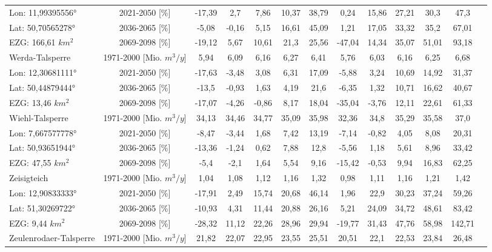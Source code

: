 \begin{longtable}{@{\extracolsep{\fill}}lc|ccccc||cccccc}
\cline{2-13} 
Lon: 11,99395556° & 2021-2050 [\%]  & -17,39 & 2,7 & 7,86 & 10,37 & 38,79 & 0,24 & 15,86 & 27,21 & 30,3 & 47,3 & \\ 
Lat: 50,70565278° & 2036-2065 [\%]  & -5,08 & -0,16 & 5,15 & 16,61 & 45,09 & 1,21 & 17,05 & 33,32 & 35,2 & 67,01 & \\ 
EZG: 166,61 $km^2$ & 2069-2098 [\%]  & -19,12 & 5,67 & 10,61 & 21,3 & 25,56 & -47,04 & 14,34 & 35,07 & 51,01 & 93,18 & \\ 
\hline 
Werda-Talsperre & 1971-2000 [Mio. $m^3/y$]  & 5,94 & 6,09 & 6,16 & 6,27 & 6,41 & 5,76 & 6,03 & 6,16 & 6,25 & 6,68 & \\ 
\cline{2-13} 
Lon: 12,30681111° & 2021-2050 [\%]  & -17,63 & -3,48 & 3,08 & 6,31 & 17,09 & -5,88 & 3,24 & 10,69 & 14,92 & 31,37 & \\ 
Lat: 50,44879444° & 2036-2065 [\%]  & -13,5 & -0,93 & 1,63 & 4,19 & 21,6 & -6,35 & 1,32 & 10,71 & 16,62 & 40,67 & \\ 
EZG: 13,46 $km^2$ & 2069-2098 [\%]  & -17,07 & -4,26 & -0,86 & 8,17 & 18,04 & -35,04 & -3,76 & 12,11 & 22,61 & 61,33 & \\ 
\hline 
Wiehl-Talsperre & 1971-2000 [Mio. $m^3/y$]  & 34,13 & 34,46 & 34,77 & 35,09 & 35,98 & 32,36 & 34,8 & 35,29 & 35,58 & 37,0 & \\ 
\cline{2-13} 
Lon: 7,667577778° & 2021-2050 [\%]  & -8,47 & -3,44 & 1,68 & 7,42 & 13,19 & -7,14 & -0,82 & 4,05 & 8,08 & 20,31 & \\ 
Lat: 50,93651944° & 2036-2065 [\%]  & -13,36 & -1,24 & 0,62 & 7,88 & 12,8 & -5,56 & 1,18 & 5,61 & 8,96 & 33,42 & \\ 
EZG: 47,55 $km^2$ & 2069-2098 [\%]  & -5,4 & -2,1 & 1,64 & 5,54 & 9,16 & -15,42 & -0,53 & 9,94 & 16,83 & 62,25 & \\ 
\hline 
Zeisigteich & 1971-2000 [Mio. $m^3/y$]  & 1,04 & 1,08 & 1,12 & 1,16 & 1,32 & 0,98 & 1,11 & 1,16 & 1,21 & 1,42 & \\ 
\cline{2-13} 
Lon: 12,90833333° & 2021-2050 [\%]  & -17,91 & 2,49 & 15,74 & 20,68 & 46,14 & 1,96 & 22,9 & 30,23 & 37,24 & 59,26 & \\ 
Lat: 51,30269722° & 2036-2065 [\%]  & -10,93 & 4,31 & 11,44 & 20,88 & 26,16 & 5,21 & 24,09 & 34,72 & 48,61 & 83,42 & \\ 
EZG: 9,44 $km^2$ & 2069-2098 [\%]  & -28,32 & 11,12 & 22,26 & 28,96 & 29,94 & -19,77 & 31,43 & 47,76 & 58,98 & 142,71 & \\ 
\hline 
Zeulenrodaer-Talsperre & 1971-2000 [Mio. $m^3/y$]  & 21,82 & 22,07 & 22,95 & 23,55 & 25,51 & 20,51 & 22,1 & 22,53 & 23,84 & 26,48 & \\ 

\end{longtable}

